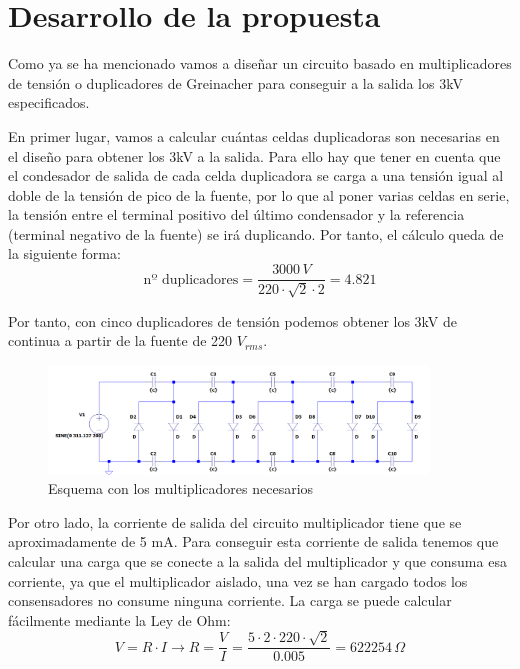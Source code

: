 \section{Desarrollo de la propuesta}

Como ya se ha mencionado vamos a diseñar un circuito basado en multiplicadores 
de tensión o duplicadores de Greinacher para conseguir a la salida los 3kV 
especificados. 

En primer lugar, vamos a calcular cuántas celdas duplicadoras son necesarias 
en el diseño para obtener los 3kV a la salida. Para ello hay que tener en cuenta que el condesador 
de salida de
cada celda duplicadora se carga a una tensión igual al doble de la tensión de pico de la fuente, por lo que 
al poner varias celdas en serie, la tensión entre el terminal positivo del último condensador 
y la referencia (terminal negativo de la fuente) se irá duplicando. Por tanto, el cálculo 
queda de la siguiente forma:
\begin{equation}
    \text{nº duplicadores} = \frac{3000\,V}{220\cdot\sqrt{2}\cdot2} = 4.821
\end{equation}

Por tanto, con cinco duplicadores de tensión podemos obtener los 3kV de continua a partir 
de la fuente de 220 $V_{rms}$. 
\begin{figure}[H]
    \centering
    \includegraphics[width=0.9\textwidth]{img/mult_final.png}
    \caption{Esquema con los multiplicadores necesarios}
    \label{fig:esquema_mult}
\end{figure}

Por otro lado, la corriente de salida del circuito multiplicador tiene que se 
aproximadamente de 5 mA. Para conseguir esta corriente de salida tenemos que calcular 
una carga que se conecte a la salida del multiplicador y que consuma esa corriente, ya que el multiplicador 
aislado, una vez se han cargado todos los consensadores no consume ninguna corriente. La carga 
se puede calcular fácilmente mediante la Ley de Ohm:
\begin{equation}
    V = R\cdot I \rightarrow R = \frac{V}{I} = \frac{5\cdot2\cdot220\cdot\sqrt{2}}{0.005} = 622254\,\Omega
\end{equation}

